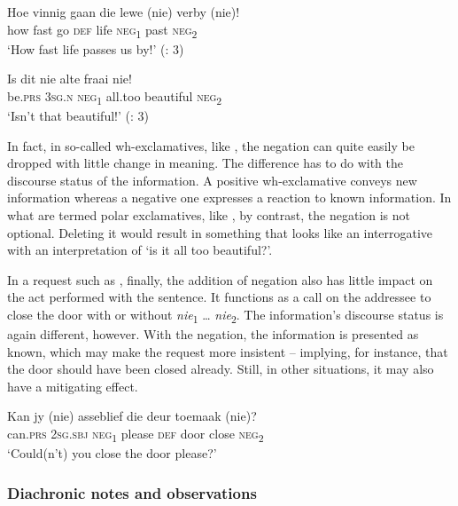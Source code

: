 \documentclass[output=paper,colorlinks,citecolor=brown]{langscibook}
\begin{document}
\ea\label{ex:afr:50}
    \ea\label{ex:afr:50a}
        \gll Hoe vinnig gaan die lewe (nie) verby (nie)! \\ 
             how fast go \textsc{def} life \textsc{neg}\textsubscript{1} past    \textsc{neg}\textsubscript{2} \\
        \glt ‘How fast life passes us by!’ (\citealt{BiberauerPotgieter2017}: 3)
    
    \ex\label{ex:afr:50b}
        \gll Is dit nie alte fraai nie! \\
             be.\textsc{prs} \textsc{3sg.n} \textsc{neg}\textsubscript{1} all.too  beautiful \textsc{neg}\textsubscript{2}\\
        \glt ‘Isn’t that beautiful!’ (\citealt{BiberauerPotgieter2017}: 3)
    \z
\z 

In fact, in so-called wh-exclamatives, like , the negation can quite easily be dropped with little change in meaning. The difference has to do with the discourse status of the information. A positive wh-exclamative conveys new information whereas a negative one expresses a reaction to known information. In what are termed polar exclamatives, like , by contrast, the negation is not optional. Deleting it would result in something that looks like an interrogative with an interpretation of ‘is it all too beautiful?’.

In a request such as , finally, the addition of negation also has little impact on the act performed with the sentence. It functions as a call on the addressee to close the door with or without \textit{nie}\textsubscript{1} … \textit{nie}\textsubscript{2}. The information’s discourse status is again different, however. With the negation, the information is presented as known, which may make the request more insistent – implying, for instance, that the door should have been closed already. Still, in other situations, it may also have a mitigating effect.

\ea\label{ex:afr:51}
    \gll Kan jy (nie) asseblief die deur toemaak (nie)? \\
         can.\textsc{prs} \textsc{2sg.sbj} \textsc{neg}\textsubscript{1} please \textsc{def} door close      \textsc{neg}\textsubscript{2}\\
    \glt ‘Could(n’t) you close the door please?’
\z 

\subsubsection{Diachronic notes and observations}
\end{document}
